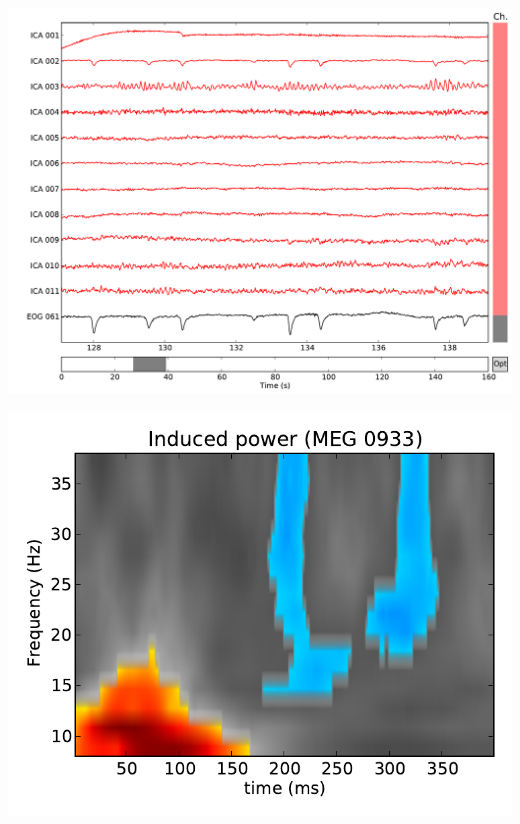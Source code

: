 \documentclass[t,11pt,compress]{beamer} %
\newcommand{\vfillll}{\vfilll\vfilll\vfilll\vfilll\vfilll\vfilll\vfilll\vfilll\vfilll\vfilll\vfilll\vfilll\vfilll\vfilll\vfilll\vfilll\vfilll\vfilll\vfilll\vfilll\vfilll\vfilll\vfilll\vfilll\vfilll\vfilll\vfilll\vfilll\vfilll\vfilll\vfilll\vfilll\vfilll\vfilll\vfilll\vfilll\vfilll\vfilll\vfilll\vfilll}
\begin{document}
\begin{frame}[plain,t,c]
\vfillll


\vfillll

\vspace*{-0.5em}%


\begin{minipage}{1.09\linewidth}

\hspace{0.5em}%
\begin{minipage}{.22\linewidth}
    \includegraphics[width=\linewidth]{ica_via_browser.pdf}%
\end{minipage}%
\hspace{1.5em}%
\begin{minipage}{.23\linewidth}
    \includegraphics[width=\linewidth]{stats_cluster_tfr.pdf}

\end{minipage}
\end{minipage}
\end{frame}
\end{document}
